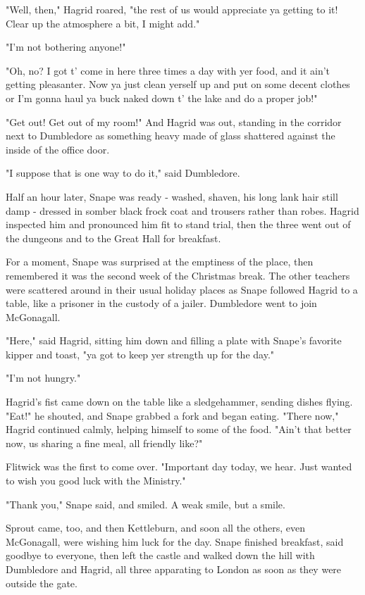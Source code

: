 \documentclass[a4paper,11pt]{article}
\begin{document}
"Well, then," Hagrid roared, "the rest of us would appreciate ya getting to it! Clear up the atmosphere a bit, I might add."

"I'm not bothering anyone!"

"Oh, no? I got t' come in here three times a day with yer food, and it ain't getting pleasanter. Now ya just clean yerself up and put on some decent clothes or I'm gonna haul ya buck naked down t' the lake and do a proper job!"

"Get out! Get out of my room!" And Hagrid was out, standing in the corridor next to Dumbledore as something heavy made of glass shattered against the inside of the office door.

"I suppose that is one way to do it," said Dumbledore.

Half an hour later, Snape was ready - washed, shaven, his long lank hair still damp - dressed in somber black frock coat and trousers rather than robes. Hagrid inspected him and pronounced him fit to stand trial, then the three went out of the dungeons and to the Great Hall for breakfast.

For a moment, Snape was surprised at the emptiness of the place, then remembered it was the second week of the Christmas break. The other teachers were scattered around in their usual holiday places as Snape followed Hagrid to a table, like a prisoner in the custody of a jailer. Dumbledore went to join McGonagall.

"Here," said Hagrid, sitting him down and filling a plate with Snape's favorite kipper and toast, "ya got to keep yer strength up for the day."

"I'm not hungry."

Hagrid's fist came down on the table like a sledgehammer, sending dishes flying. "Eat!" he shouted, and Snape grabbed a fork and began eating. "There now," Hagrid continued calmly, helping himself to some of the food. "Ain't that better now, us sharing a fine meal, all friendly like?"

Flitwick was the first to come over. "Important day today, we hear. Just wanted to wish you good luck with the Ministry."

"Thank you," Snape said, and smiled. A weak smile, but a smile.

Sprout came, too, and then Kettleburn, and soon all the others, even McGonagall, were wishing him luck for the day. Snape finished breakfast, said goodbye to everyone, then left the castle and walked down the hill with Dumbledore and Hagrid, all three apparating to London as soon as they were outside the gate.
\end{document}
